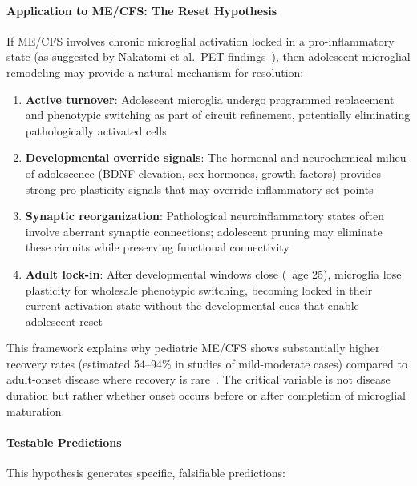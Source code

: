 \begin{hypothesis}
\paragraph{Application to ME/CFS: The Reset Hypothesis}

If ME/CFS involves chronic microglial activation locked in a pro-inflammatory state (as suggested by Nakatomi et al.\ PET findings~\cite{Nakatomi2014neuroinflammation}), then adolescent microglial remodeling may provide a natural mechanism for resolution:

\begin{enumerate}
    \item \textbf{Active turnover}: Adolescent microglia undergo programmed replacement and phenotypic switching as part of circuit refinement, potentially eliminating pathologically activated cells

    \item \textbf{Developmental override signals}: The hormonal and neurochemical milieu of adolescence (BDNF elevation, sex hormones, growth factors) provides strong pro-plasticity signals that may override inflammatory set-points

    \item \textbf{Synaptic reorganization}: Pathological neuroinflammatory states often involve aberrant synaptic connections; adolescent pruning may eliminate these circuits while preserving functional connectivity

    \item \textbf{Adult lock-in}: After developmental windows close (~age 25), microglia lose plasticity for wholesale phenotypic switching, becoming locked in their current activation state without the developmental cues that enable adolescent reset
\end{enumerate}

This framework explains why pediatric ME/CFS shows substantially higher recovery rates (estimated 54--94\% in studies of mild-moderate cases) compared to adult-onset disease where recovery is rare~\cite{Rowe2019pediatric}. The critical variable is not disease duration but rather whether onset occurs before or after completion of microglial maturation.

\paragraph{Testable Predictions}

This hypothesis generates specific, falsifiable predictions:


\end{hypothesis}
